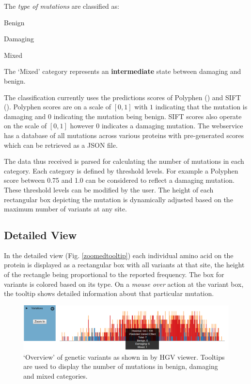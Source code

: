 \documentclass{bioinfo}
\begin{document}
The \textit{type of mutations} are classified as:
\begin{inparaenum}[(a)]
\item {Benign} %
\item {Damaging} %
\item {Mixed}
\end{inparaenum}

The `Mixed' category represents an \textbf{intermediate} state between damaging and benign.

The classification currently uses the predictions scores of Polyphen (\cite{Ramensky2002}) and SIFT (\cite{Kumar2009}). Polyphen scores are on a scale of $[0,1]$ with $1$ indicating that the mutation is damaging and $0$ indicating the mutation being benign. SIFT scores also operate on the scale of $[0,1]$ however $0$ indicates a damaging mutation.
The webservice has a database of all mutations across various proteins with pre-generated scores which can be retrieved as a JSON file.

The data thus received is parsed for calculating the number of mutations in each category. Each category is defined by threshold levels. For example a Polyphen score between 0.75 and 1.0 can be considered to reflect a damaging mutation. These threshold levels can be modified by the user. The height of each rectangular box depicting the mutation is dynamically adjusted based on the maximum number of variants at any site.

\subsection{Detailed View}

In the detailed view (Fig. \ref{zoomedtooltip}) each individual amino acid on the protein is displayed as a rectangular box with all variants at that site, the height of the rectangle being proportional to the reported frequency. The box for variants is colored based on its type. On a \textit{mouse over} action at the variant box, the tooltip shows detailed information about that particular mutation.
\begin{figure}
\includegraphics[width=\linewidth]{images/overview_withtooltip}
\caption{`Overview' of genetic variants as shown in by HGV viewer. Tooltips are used to display the number of mutations in benign, damaging and mixed categories.}
\label{overviewtooltip}
\end{figure}
\end{document}
